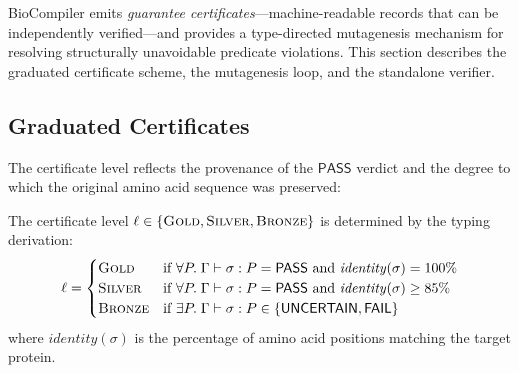 \documentclass[sigplan,10pt,manuscript,review,anonymous]{acmart}
\newcommand{\PASS}{\ensuremath{\mathsf{PASS}}\xspace}
\newcommand{\FAIL}{\ensuremath{\mathsf{FAIL}}\xspace}
\newcommand{\UNCERTAIN}{\ensuremath{\mathsf{UNCERTAIN}}\xspace}
\newcommand{\seq}{\sigma}
\newcommand{\pred}{P}
\newcommand{\judg}[3]{#1 \vdash #2 : #3}
\newcommand{\GOLD}{\textsc{Gold}\xspace}
\newcommand{\SILVER}{\textsc{Silver}\xspace}
\newcommand{\BRONZE}{\textsc{Bronze}\xspace}
\begin{document}
BioCompiler emits \emph{guarantee certificates}---machine-readable
records that can be independently verified---and provides a
type-directed mutagenesis mechanism for resolving structurally
unavoidable predicate violations.
This section describes the graduated certificate scheme, the
mutagenesis loop, and the standalone verifier.

\subsection{Graduated Certificates}\label{sec:certs}

The certificate level reflects the provenance of the \PASS{} verdict
and the degree to which the original amino acid sequence was preserved:

\begin{definition}
The certificate level $\ell \in \{\GOLD, \SILVER, \BRONZE\}$ is
determined by the typing derivation:
\[
  \ell =
  \begin{cases}
    \GOLD & \text{if } \forall \pred.\;
            \judg{\Gamma}{\seq}{\pred} = \PASS
            \text{ and } \mathit{identity}(\seq) = 100\% \\
    \SILVER & \text{if } \forall \pred.\;
              \judg{\Gamma}{\seq}{\pred} = \PASS
              \text{ and } \mathit{identity}(\seq) \ge 85\% \\
    \BRONZE & \text{if } \exists \pred.\;
              \judg{\Gamma}{\seq}{\pred} \in \{\UNCERTAIN, \FAIL\}
  \end{cases}
\]
where $\mathit{identity}(\seq)$ is the percentage of amino acid
positions matching the target protein.
\end{definition}
\end{document}
